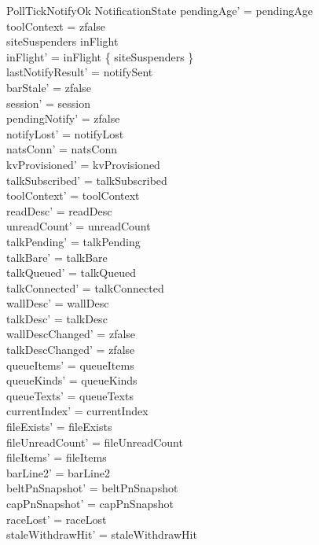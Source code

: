 \documentclass[a4paper,10pt,fleqn]{article}
\begin{document}
\begin{schema}{PollTickNotifyOk}
  \Delta NotificationState
  \where
  pendingAge' = pendingAge \\
  toolContext = zfalse \\
  siteSuspenders \in inFlight \\
  inFlight' = inFlight \setminus \{ siteSuspenders \} \\
  lastNotifyResult' = notifySent \\
  barStale' = zfalse \\
  session' = session \\
  pendingNotify' = zfalse \\
  notifyLost' = notifyLost \\
  natsConn' = natsConn \\
  kvProvisioned' = kvProvisioned \\
  talkSubscribed' = talkSubscribed \\
  toolContext' = toolContext \\
  readDesc' = readDesc \\
  unreadCount' = unreadCount \\
  talkPending' = talkPending \\
  talkBare' = talkBare \\
  talkQueued' = talkQueued \\
  talkConnected' = talkConnected \\
  wallDesc' = wallDesc \\
  talkDesc' = talkDesc \\
  wallDescChanged' = zfalse \\
  talkDescChanged' = zfalse \\
  queueItems' = queueItems \\
  queueKinds' = queueKinds \\
  queueTexts' = queueTexts \\
  currentIndex' = currentIndex \\
  fileExists' = fileExists \\
  fileUnreadCount' = fileUnreadCount \\
  fileItems' = fileItems \\
  barLine2' = barLine2 \\
  beltPnSnapshot' = beltPnSnapshot \\
  capPnSnapshot' = capPnSnapshot \\
  raceLost' = raceLost \\
  staleWithdrawHit' = staleWithdrawHit \\

\end{schema}
\end{document}
